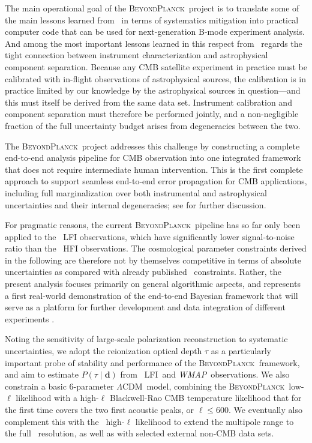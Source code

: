 \documentclass[twocolumn]{aa}
\def\WMAP{\textit{WMAP}}
\def\LCDM{$\Lambda$CDM}
\newcommand{\BP}{\textsc{BeyondPlanck}}
\newcommand{\lfi}[0]{LFI}
\begin{document}
The main operational goal of the \BP\ project \citep{bp01} is to
translate some of the main lessons learned from \Planck\ in terms of
systematics mitigation into practical computer code that can be used
for next-generation B-mode experiment analysis. And among the most
important lessons learned in this respect from \Planck\ regards the
tight connection between instrument characterization and astrophysical
component separation. Because any CMB satellite experiment in practice
must be calibrated with in-flight observations of astrophysical
sources, the calibration is in practice limited by our knowledge by
the astrophysical sources in question---and this must itself be
derived from the same data set. Instrument calibration and component
separation must therefore be performed jointly, and a non-negligible
fraction of the full uncertainty budget arises from degeneracies
between the two.

The \BP\ project addresses this challenge by constructing a complete
end-to-end analysis pipeline for CMB observation into one integrated
framework that does not require intermediate human intervention. This
is the first complete approach to support seamless end-to-end error
propagation for CMB applications, including full marginalization over
both instrumental and astrophysical uncertainties and their
internal degeneracies; see \citet{bp01,bp11} for further discussion.

For pragmatic reasons, the current \BP\ pipeline has so far only been
applied to the \Planck\ LFI observations, which have significantly
lower signal-to-noise ratio than the \Planck\ HFI observations. The
cosmological parameter constraints derived in the following are
therefore not by themselves competitive in terms of absolute
uncertainties as compared with already published
\Planck\ constraints. Rather, the present analysis focuses primarily
on general algorithmic aspects, and represents a first real-world
demonstration of the end-to-end Bayesian framework that will serve as
a platform for further development and data integration of different
experiments \citep{bp05}.

Noting the sensitivity of large-scale polarization reconstruction 
to systematic uncertainties, we adopt the reionization optical depth $\tau$ as a
particularly important probe of stability and performance of the
\BP\ framework, and aim to estimate $P(\tau\mid\mathbf{d})$ from
\Planck\ \lfi\ and \WMAP\ observations. We also constrain a basic
$6$-parameter \LCDM\ model, combining the \BP\ low-$\ell$ likelihood
with a high-$\ell$ Blackwell-Rao CMB temperature likelihood that for
the first time covers the two first acoustic peaks, or
$\ell\le600$. We eventually also complement this with the
\Planck\ high-$\ell$ likelihood to extend the multipole range to the
full \Planck\ resolution, as well as with selected external non-CMB data
sets.
\end{document}
